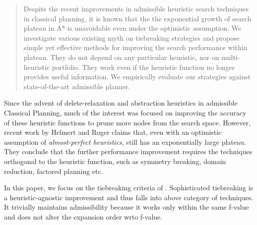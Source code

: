 
\begin{abstract}
Despite the recent improvements in admissible heuristic search techniques
in classical planning, it is known that the the exponential growth of
search plateau in A* is unavoidable even under the optimistic assumption.
We investigate various existing myth on tiebreaking
strategies and propose simple yet effective methods for improving the
search performance within plateau.
 They do not depend on any particular heuristic, nor
 on multi-heuristic portfolio.
 They work even if the heuristic
 function no longer provides useful information.
 We empirically evaluate our strategies against state-of-the-art admissible planner.
\end{abstract}

Since the advent of delete-relaxation and abstraction heuristics in
admissible Classical Planning, much of the interest was focused on improving
the accuracy of these heuristic functions to prune more nodes from the
search space.
% 
However, recent work by Helmert and Roger
 claims that, even with an optimistic
assumption of \emph{almost-perfect heuristics}, \astar still has an
exponentially large plateau. They conclude that the further performance
improvement requires the techniques orthogonal to the heuristic
function, such as symmetry breaking, domain reduction, factored planning
etc.

In this paper, we focus on the tiebreaking criteria of \astar.
Sophisticated tiebreaking is a heuristic-agnostic improvement and thus 
falls into above category of techniques.
It trivially maintains admissibility because it works only within the
same f-value and does not alter the expansion order wrto f-value.




